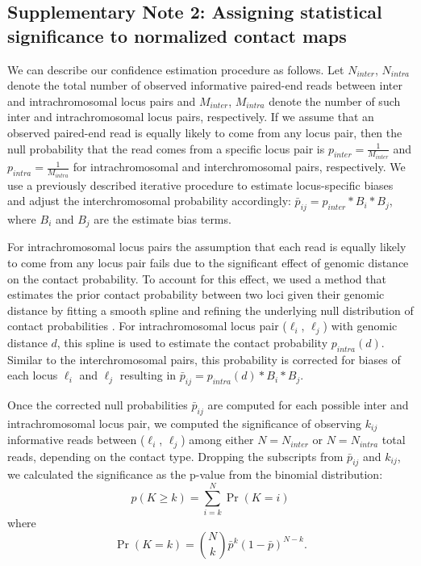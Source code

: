 \subsection*{Supplementary Note 2: Assigning statistical significance to normalized contact maps}
\label{supp:fithic}
We can describe our confidence estimation procedure as follows. Let $N_{inter}$, $N_{intra}$ denote the total number of observed informative paired-end reads between inter and intrachromosomal locus pairs and $M_{inter}$, $M_{intra}$ denote the number of such inter and intrachromosomal locus pairs, respectively. If we assume that an observed paired-end read is equally likely to come from any locus pair, then the null probability that the read comes from a specific locus pair is $p_{inter}=\frac{1}{M_{inter}}$ and $p_{intra}=\frac{1}{M_{intra}}$ for intrachromosomal and interchromosomal pairs, respectively. We use a previously described iterative procedure \cite{imakaev:iterative} to estimate locus-specific biases and adjust the interchromosomal probability accordingly: $\bar{p}_{ij} = p_{inter}* B_i * B_j$, where $B_i$ and $B_j$ are the estimate bias terms.

For intrachromosomal locus pairs the assumption that each read is equally likely to come from any locus pair fails due to the significant effect of genomic distance on the contact probability. To account for this effect, we used a method that estimates the prior contact probability between two loci given their genomic distance by fitting a smooth spline and refining the underlying null distribution of contact probabilities \cite{ay:statistical}. For intrachromosomal locus pair ($\ell_i$, $\ell_j$) with genomic distance $d$, this spline is used to estimate the contact probability $p_{intra}(d)$.
Similar to the interchromosomal pairs, this probability is corrected for biases of each locus $\ell_i$ and $\ell_j$ resulting in $\bar{p}_{ij} = p_{intra}(d)* B_i * B_j$.

Once the corrected null probabilities $\bar{p}_{ij}$ are computed for each
possible inter and intrachromosomal locus pair, we computed the significance
of observing $k_{ij}$ informative reads between ($\ell_i$, $\ell_j$) among
either $N=N_{inter}$ or $N=N_{intra}$ total reads, depending on the contact type.
Dropping the subscripts from $\bar{p}_{ij}$ and $k_{ij}$, we calculated the
significance as the p-value from the binomial distribution:
\begin{equation}
p(K\ge k) = \sum_{i=k}^N \Pr(K = i)
\label{equation:disc-pvalue}
\end{equation} where $$\Pr(K=k) = {N \choose k} \bar{p}^k \left(1 - \bar{p}\right)^{N-k}.$$

